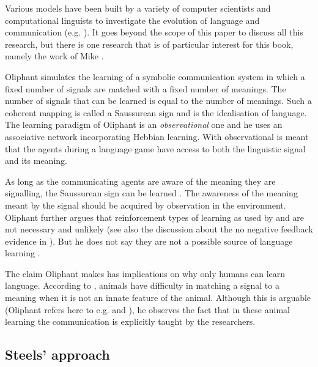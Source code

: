 

Various models have been built by a variety of computer scientists and computational linguists to investigate the evolution of language and communication (e.g. \citealt{cangelosiparisi:1998,kirby:1997,maclennan:1991,oliphant:1997,wernerdyer:1991}). It goes beyond the scope of this paper  to discuss all this research, but there is one research that is of particular interest for this book, namely the work of Mike \citet{oliphant:1997,oliphant:1998,oliphant:2000}.

Oliphant simulates the learning of a symbolic communication system in which a fixed number of signals are matched with a fixed number of meanings. The number of signals that can be learned is equal to the number of meanings. Such a coherent mapping is called a Saussurean sign \citep{saussure:1974} and is the idealisation of language. The learning paradigm of Oliphant is an {\em observational} one and he uses an associative network incorporating Hebbian learning. With observational is meant that the agents during a language game have access to both the linguistic signal and its meaning.

As long as the communicating agents are aware of the meaning they are signalling, the Saussurean sign can be learned \citep{oliphant:1997,oliphant:2000}. The awareness of the meaning meant by the signal should be acquired by observation in the environment. Oliphant further argues that reinforcement types of learning as used by \citet{yancostein} and \citet{steels:1996a} are not necessary and unlikely (see also the discussion about the no negative feedback evidence in ). But he does not say they are not a possible source of language learning \citep{oliphant:2000}.

The claim Oliphant makes has implications on why only humans can learn language. According to \citet{oliphant:1998}, animals have difficulty in matching a signal to a meaning when it is not an innate feature of the animal. Although this is arguable (Oliphant refers here to e.g. \citealt{gardners:1969} and \citealt{premack:1971}), he observes the fact that in these animal learning the communication is explicitly taught by the researchers.


\subsection{Steels' approach}\label{s:intro:th}

